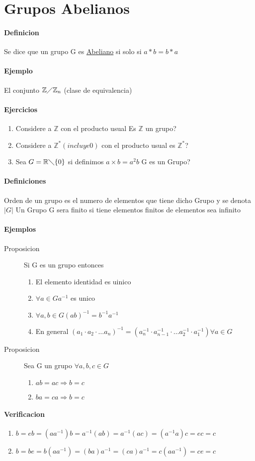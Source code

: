 \newpage
\section{Grupos Abelianos}
  \paragraph{Definicion}
  Se dice que un grupo G es \underline{Abeliano} si solo si $a*b=b*a$
  \paragraph{Ejemplo}
    El conjunto $\mathbb{Z} \diagup \mathbb{Z} _{n}$ (clase de equivalencia)
  \paragraph{Ejercicios}
    \begin{enumerate}
      \item Considere a $\mathbb{Z}$ con el producto usual Es $\mathbb{Z}$ un grupo?
      \item Considere a $\mathbb{Z}^{*}(incluye 0)$ con el producto usual es $\mathbb{Z} ^{*}$?
      \item Sea $G=\mathbb{R} \diagdown \{ 0\} $ si definimos $a\times b=a^{2}b$ G es un Grupo?
    \end{enumerate}
 \paragraph{Definiciones}
   Orden de un grupo es el numero de elementos que tiene dicho Grupo y se denota $|G| $ 
  Un Grupo G sera finito si tiene elementos finitos de elementos sea infinito
  \paragraph{Ejemplos}
\begin{description} 
  \item[Proposicion] Si G es un grupo entonces
  \begin{enumerate}
    \item El elemento identidad es uinico
    \item $\forall a\in G a^{-1}$ es unico
    \item $\forall a,b \in G(ab)^{-1}=b^{-1}a^{-1}$
    \item En general $(a_{1}\cdot a_{2}\cdot  \dots a_{n}) ^{-1} = (a_{n}^{-1}\cdot a_{n-1}^{-1}\cdot \dots a_{2}^{-1}\cdot a_{1}^{-1} ) \forall  a\in G $ 
  \end{enumerate}
  \item[Proposicion] Sea G un grupo $\forall a,b,c\in G$
  \begin{enumerate}
    \item $ab=ac \Rightarrow b=c$
    \item $ba=ca \Rightarrow b=c$
  \end{enumerate}
\end{description}
\paragraph{Verificacion}
\begin{enumerate}
  \item $b=eb=(aa^{-1})b=a^{-1}(ab)=a^{-1}(ac)=(a^{-1}a)c=ec=c$
  \item $b=be=b(aa^{-1})=(ba)a^{-1}=(ca)a^{-1}=c(aa^{-1})=ce=c$
\end{enumerate}

